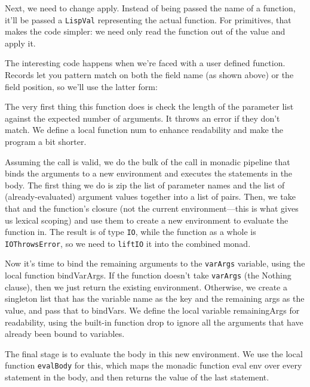 Next, we need to change apply. Instead of being passed the name of a function, it'll be passed a \verb|LispVal| representing the actual function. For primitives, that makes the code simpler: we need only read the function out of the value and apply it.
 
 
The interesting code happens when we're faced with a user defined function. Records let you pattern match on both the field name (as shown above) or the field position, so we'll use the latter form:
 
 
The very first thing this function does is check the length of the parameter list against the expected number of arguments. It throws an error if they don't match. We define a local function num to enhance readability and make the program a bit shorter.
 
Assuming the call is valid, we do the bulk of the call in monadic pipeline that binds the arguments to a new environment and executes the statements in the body. The first thing we do is zip the list of parameter names and the list of (already-evaluated) argument values together into a list of pairs. Then, we take that and the function's closure (not the current environment---this is what gives us lexical scoping) and use them to create a new environment to evaluate the function in. The result is of type \verb|IO|, while the function as a whole is \verb|IOThrowsError|, so we need to \verb|liftIO| it into the combined monad.
 
Now it's time to bind the remaining arguments to the \verb|varArgs| variable, using the local function bindVarArgs. If the function doesn't take \verb|varArgs| (the Nothing clause), then we just return the existing environment. Otherwise, we create a singleton list that has the variable name as the key and the remaining args as the value, and pass that to bindVars. We define the local variable remainingArgs for readability, using the built-in function drop to ignore all the arguments that have already been bound to variables.
 
The final stage is to evaluate the body in this new environment. We use the local function \verb|evalBody| for this, which maps the monadic function eval env over every statement in the body, and then returns the value of the last statement.
 
